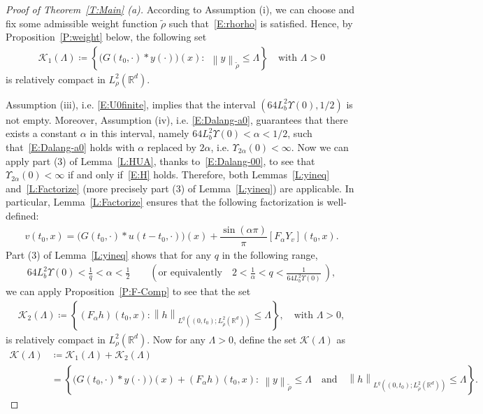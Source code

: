 \documentclass[a4paper,11pt]{article}%
\theoremstyle{plain}
\theoremstyle{definition}
\numberwithin{equation}{section}
\newcommand{\R}{\mathbb{R}}
\newcommand{\Norm}[1]{\left\| #1 \right\|}
\begin{document}
\begin{proof}[Proof of Theorem~\ref{T:Main} (a)]
  According to Assumption (i), we can choose and fix some admissible weight function $\tilde{\rho}$
  such that~\eqref{E:rhorho} is satisfied. Hence, by Proposition~\ref{P:weight} below, the following
  set
  \begin{align*}
    \mathscr{K}_1 (\Lambda) \coloneqq \left\{\big(G(t_0,\cdot)*y(\cdot)\big)(x): \:\:\Norm{y}_{\tilde{\rho}} \le \Lambda \right\}
    \quad \text{with $\Lambda>0$}
  \end{align*}
  is relatively compact in $L_\rho^2 (\R^d)$.

  Assumption (iii), i.e. \eqref{E:U0finite}, implies that the interval $\left(64L_b^2 \Upsilon(0),
  1/2\right)$ is not empty. Moreover, Assumption (iv), i.e. \eqref{E:Dalang-a0}, guarantees that
  there exists a constant $\alpha$ in this interval, namely $64L_b^2\Upsilon(0) <\alpha<1/2$, such
  that~\eqref{E:Dalang-a0} holds with $\alpha$ replaced by $2\alpha$, i.e. 
  $\Upsilon_{2\alpha}(0)<\infty$. Now we can apply part (3) of Lemma~\ref{L:HUA}, thanks
  to~\eqref{E:Dalang-00}, to see that $\Upsilon_{2\alpha}(0)<\infty$ if and only if~\eqref{E:H}
  holds. Therefore, both Lemmas~\ref{L:yineq} and~\ref{L:Factorize} (more precisely part (3) of
  Lemma~\ref{L:yineq}) are applicable. In particular, Lemma~\ref{L:Factorize} ensures that the
  following factorization is well-defined:
  \begin{align}\label{E:Fact}
    v(t_0,x) = \Big(G(t_0,\cdot) * u(t-t_0,\cdot)\Big)(x) +\dfrac{\sin(\alpha \pi)}{\pi} \left[F_\alpha Y_v\right](t_0,x).
  \end{align}
  Part (3) of Lemma~\ref{L:yineq} shows that for any $q$ in the following range,
  \begin{align}\label{E:Choice}
    64 L_b^2 \Upsilon(0) < \frac{1}{q} < \alpha <\frac{1}{2}
    \qquad \left(\text{or equivalently} \quad
    2< \frac{1}{\alpha} < q < \frac{1}{64 L_b^2 \Upsilon(0)}\:\right),
  \end{align}
  we can apply Proposition~\ref{P:F-Comp} to see that the set
  \begin{align*}
    \mathscr{K}_2 (\Lambda)\coloneqq
    \left\{(F_\alpha h)(t_0,x): \Norm{h}_{L^q\left((0,t_0);L^2_{\tilde{\rho}}\left(\R^d\right)\right)} \le \Lambda \right\},
    \quad \text{with $\Lambda>0$},
  \end{align*}
  is relatively compact in $L_\rho^2 (\R^d)$. Now for any $\Lambda>0$, define the set $\mathscr{K}
  (\Lambda)$ as
  \begin{align*}
    \mathscr{K} (\Lambda)
    & \coloneqq \mathscr{K}_1 (\Lambda) + \mathscr{K}_2 (\Lambda) \\
    & = \left\{\big(G(t_0,\cdot)*y(\cdot)\big)(x)+(F_\alpha h)(t_0, x): \:\Norm{y}_{\tilde{\rho}}
    \le \Lambda \quad \text{and}\quad\Norm{h}_{L^q\left((0,t_0);L^2_{\tilde{\rho}}\left(\R^d\right)\right)} \le \Lambda \right\}.
  \end{align*}


\end{proof}
\end{document}
